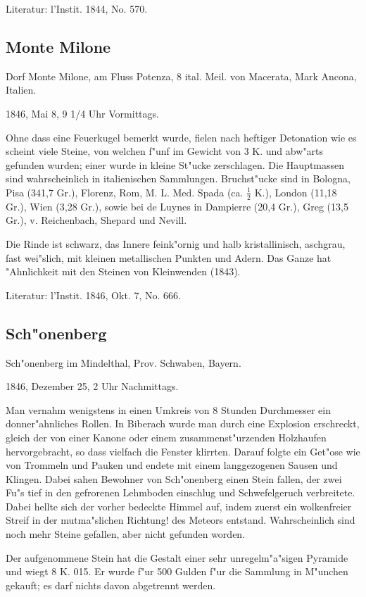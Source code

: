 \documentclass[a4paper, 11pt, oneside]{article}
\begin{document}
Literatur: l'Instit. 1844, No. 570.

\subsection{Monte Milone}

Dorf Monte Milone, am Fluss Potenza, 8 ital. Meil. von Macerata, Mark Ancona, Italien.

1846, Mai 8, 9 1/4 Uhr Vormittags.

Ohne dass eine Feuerkugel bemerkt wurde, fielen nach heftiger Detonation wie es scheint viele Steine, von welchen f"unf im Gewicht von 3 K. und abw"arts gefunden wurden; einer wurde in kleine St"ucke zerschlagen. Die Hauptmassen sind wahrscheinlich in italienischen Sammlungen. Bruchst"ucke sind in Bologna, Pisa (341,7 Gr.), Florenz, Rom, M. L. Med. Spada (ca. $\frac{1}{2}$ K.), London (11,18 Gr.), Wien (3,28 Gr.), sowie bei de Luynes in Dampierre (20,4 Gr.), Greg (13,5 Gr.), v. Reichenbach, Shepard und Nevill.

Die Rinde ist schwarz, das Innere feink"ornig und halb kristallinisch, aschgrau, fast wei"slich, mit kleinen metallischen Punkten und Adern. Das Ganze hat "Ahnlichkeit mit den Steinen von Kleinwenden (1843).

Literatur: l'Instit. 1846, Okt. 7, No. 666.

\subsection{Sch"onenberg}

Sch"onenberg im Mindelthal, Prov. Schwaben, Bayern.

1846, Dezember 25, 2 Uhr Nachmittags.

Man vernahm wenigstens in einen Umkreis von 8 Stunden Durchmesser ein donner"ahnliches Rollen. In Biberach wurde man durch eine Explosion erschreckt, gleich der von einer Kanone oder einem zusammenst"urzenden Holzhaufen hervorgebracht, so dass vielfach die Fenster klirrten. Darauf folgte ein Get"ose wie von Trommeln und Pauken und endete mit einem langgezogenen Sausen und Klingen. Dabei sahen Bewohner von Sch"onenberg einen Stein fallen, der zwei Fu"s tief in den gefrorenen Lehmboden einschlug und Schwefelgeruch verbreitete. Dabei hellte sich der vorher bedeckte Himmel auf, indem zuerst ein wolkenfreier Streif in der mutma"slichen Richtung! des Meteors entstand. Wahrscheinlich sind noch mehr Steine gefallen, aber nicht gefunden worden.

Der aufgenommene Stein hat die Gestalt einer sehr unregelm"a"sigen Pyramide und wiegt 8 K. 015. Er wurde f"ur 500 Gulden f"ur die Sammlung in M"unchen gekauft; es darf nichts davon abgetrennt werden.
\end{document}
